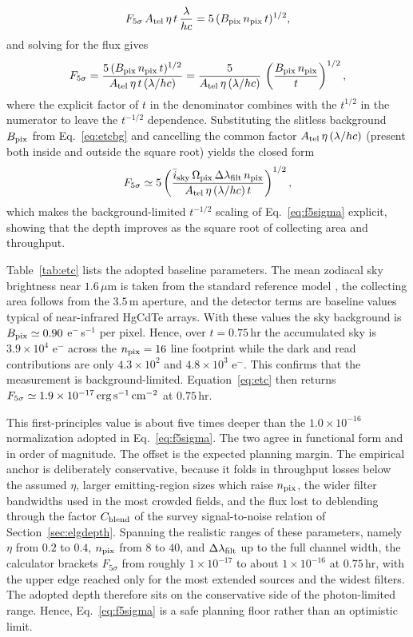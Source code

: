 \documentclass[10pt,onecolumn]{article}
\begin{document}
\[
  F_{5\sigma}\,A_{\rm tel}\,\eta\,t\,\frac{\lambda}{hc}=5\,(B_{\rm pix}\,n_{\rm pix}\,t)^{1/2},
\]
and solving for the flux gives
\[
  F_{5\sigma}=\frac{5\,(B_{\rm pix}\,n_{\rm pix}\,t)^{1/2}}{A_{\rm tel}\,\eta\,t\,(\lambda/hc)}
  =\frac{5}{A_{\rm tel}\,\eta\,(\lambda/hc)}\,\left(\frac{B_{\rm pix}\,n_{\rm pix}}{t}\right)^{1/2},
\]
where the explicit factor of $t$ in the denominator combines with the $t^{1/2}$ in the numerator to leave the $t^{-1/2}$ dependence. Substituting the slitless background $B_{\rm pix}$ from Eq.~\eqref{eq:etcbg} and cancelling the common factor $A_{\rm tel}\,\eta\,(\lambda/hc)$ (present both inside and outside the square root) yields the closed form
\begin{equation}
  F_{5\sigma}\simeq 5\left(\frac{\bar i_{\rm sky}\,\Omega_{\rm pix}\,\Delta\lambda_{\rm filt}\,n_{\rm pix}}{A_{\rm tel}\,\eta\,(\lambda/hc)\,t}\right)^{1/2},
  \label{eq:etc}
\end{equation}
which makes the background-limited $t^{-1/2}$ scaling of Eq.~\eqref{eq:f5sigma} explicit, showing that the depth improves as the square root of collecting area and throughput.

Table~\ref{tab:etc} lists the adopted baseline parameters. The mean zodiacal sky brightness near $1.6\,\mu$m is taken from the standard reference model \cite{leinert1998}, the collecting area follows from the $3.5$\,m aperture, and the detector terms are baseline values typical of near-infrared HgCdTe arrays. With these values the sky background is $B_{\rm pix}\simeq0.90$ e$^-$\,s$^{-1}$ per pixel. Hence, over $t=0.75$\,hr the accumulated sky is $3.9\times10^{4}$ e$^-$ across the $n_{\rm pix}=16$ line footprint while the dark and read contributions are only $4.3\times10^{2}$ and $4.8\times10^{3}$ e$^-$. This confirms that the measurement is background-limited. Equation~\eqref{eq:etc} then returns $F_{5\sigma}\simeq1.9\times10^{-17}\,{\rm erg\,s^{-1}\,cm^{-2}}$ at $0.75$\,hr.

This first-principles value is about five times deeper than the $1.0\times10^{-16}$ normalization adopted in Eq.~\eqref{eq:f5sigma}. The two agree in functional form and in order of magnitude. The offset is the expected planning margin. The empirical anchor is deliberately conservative, because it folds in throughput losses below the assumed $\eta$, larger emitting-region sizes which raise $n_{\rm pix}$, the wider filter bandwidths used in the most crowded fields, and the flux lost to deblending through the factor $C_{\rm blend}$ of the survey signal-to-noise relation of Section~\ref{sec:elgdepth}. Spanning the realistic ranges of these parameters, namely $\eta$ from $0.2$ to $0.4$, $n_{\rm pix}$ from $8$ to $40$, and $\Delta\lambda_{\rm filt}$ up to the full channel width, the calculator brackets $F_{5\sigma}$ from roughly $1\times10^{-17}$ to about $1\times10^{-16}$ at $0.75$\,hr, with the upper edge reached only for the most extended sources and the widest filters. The adopted depth therefore sits on the conservative side of the photon-limited range. Hence, Eq.~\eqref{eq:f5sigma} is a safe planning floor rather than an optimistic limit.
\end{document}

